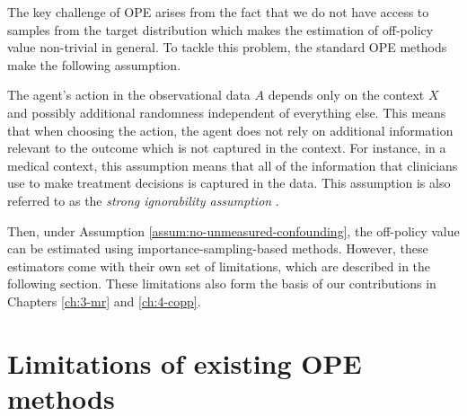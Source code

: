 The key challenge of OPE arises from the fact that we do not
have access to samples from the target distribution which makes the estimation of off-policy value non-trivial in general.
To tackle this problem, the standard OPE methods make the following assumption.

\begin{assumption}\label{assum:no-unmeasured-confounding}
    The agent's action in the observational data $A$ depends only on the context $X$ and possibly additional randomness independent of everything else. This means that when choosing the action, the agent does not rely on additional information relevant to the outcome which is not captured in the context. For instance, in a medical context, this assumption means that all of the information that clinicians use to make treatment decisions is captured in the data. This assumption is also referred to as the \emph{strong ignorability assumption} \citep{tsiatis2019dynamic}.
\end{assumption}

Then, under Assumption \ref{assum:no-unmeasured-confounding}, the off-policy value can be estimated using importance-sampling-based methods. 
However, these estimators come with their own set of limitations, which are described in the following section. 
These limitations also form the basis of our contributions in Chapters \ref*{ch:3-mr} and \ref*{ch:4-copp}.

\section{Limitations of existing OPE methods}

